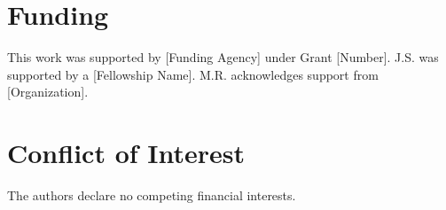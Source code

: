 \documentclass[12pt, a4paper]{article}
\begin{document}
\section*{Funding}

This work was supported by [Funding Agency] under Grant [Number]. J.S. was supported by a [Fellowship Name]. M.R. acknowledges support from [Organization].

\section*{Conflict of Interest}

The authors declare no competing financial interests.




\end{document}
